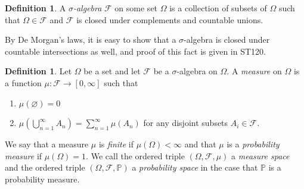 \documentclass[a4paper,11pt]{article}
\theoremstyle{plain}
\theoremstyle{definition}
\newtheorem{definition}[theorem]{Definition}
\begin{document}

\begin{definition} \citep[p.~57]{GBF}
A \textit{$\sigma$-algebra} $\mathcal{F}$ on some set $\Omega$ is a collection of subsets of $\Omega$ such that $\Omega \in \mathcal{F}$ and $\mathcal{F}$ is closed under complements and countable unions.
\end{definition}


By De Morgan's laws, it is easy to show that a $\sigma$-algebra is closed under countable intersections as well, and proof of this fact is given in ST120.

\begin{definition}\citep[p.~63]{GBF}
Let $\Omega$ be a set and let $\mathcal{F}$ be a $\sigma$-algebra on $\Omega$. A \textit{measure} on $\Omega$ is a function $\mu : \mathcal{F} \rightarrow [0,\infty]$ such that
\begin{enumerate}
\item $\mu(\varnothing) = 0$
\item $\mu(\bigcup_{n=1}^{\infty} A_n) = \sum_{n=1}^{\infty} \mu(A_n)$ for any disjoint subsets $A_i \in \mathcal{F}$.
\end{enumerate}
\end{definition}

We say that a measure $\mu$ is \textit{finite} if $\mu(\Omega) < \infty$ and that $\mu$ is a \textit{probability measure} if $\mu(\Omega) = 1$. We call the ordered triple $(\Omega,\mathcal{F},\mu)$ a \textit{measure space} and the ordered triple $(\Omega, \mathcal{F}, \mathbb{P})$ a \textit{probability space} in the case that $\mathbb{P}$ is a probability measure.
\end{document}
